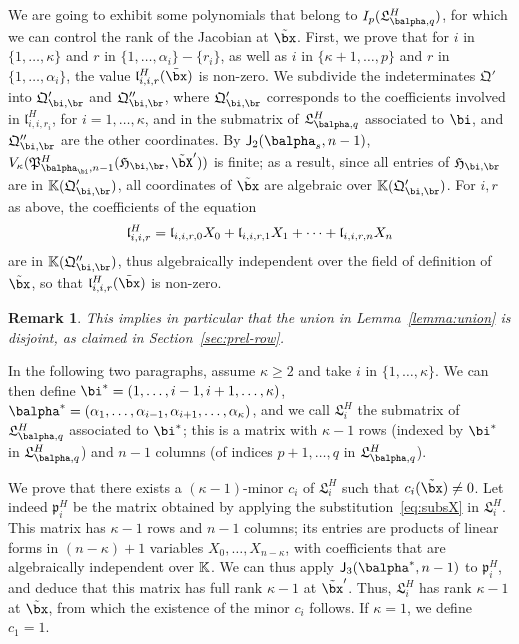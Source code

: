\documentclass[12pt]{article}
\newtheorem{remark}[definition]{Remark}
\begin{document}
We are going to exhibit some polynomials that belong to
$I_p(\mathfrak{L}^H_{\balpha,q})$, for which we can control the rank
of the Jacobian at $\tilde\bx$. First, we prove that for $i$ in
$\{1,\dots,\kappa\}$ and $r$ in $\{1,\dots,\alpha_i\}-\{r_i\}$, as
well as $i$ in $\{\kappa+1,\dots,p\}$ and $r$ in
$\{1,\dots,\alpha_i\}$, the value $\mathfrak{l}^H_{i,i,r}(\tilde\bx)$
is non-zero.  We subdivide the indeterminates $\mathfrak{Q}'$ into
$\mathfrak{Q}'_{\bi,\br}$ and $\mathfrak{Q}''_{\bi,\br}$, where
$\mathfrak{Q}'_{\bi,\br}$ corresponds to the coefficients involved in
$\mathfrak{l}^H_{i,i,r_i}$, for $i=1,\dots,\kappa$, and in the
submatrix of $\mathfrak{L}^H_{\balpha,q}$ associated to $\bi$, and
$\mathfrak{Q}''_{\bi,\br}$ are the other coordinates.  By
$\assI_2(\balpha_s,n-1)$,
$V_\kappa(\mathfrak{P}^H_{\balpha_\bi,n-1}(\mathfrak{H}_{\bi,\br},\tilde\bX'))$
is finite; as a result, since all entries of $\mathfrak{H}_{\bi,\br}$ 
are in $\KK(\mathfrak{Q}'_{\bi,\br})$,
all coordinates of $\tilde\bx$ are algebraic
over $\KK(\mathfrak{Q}'_{\bi,\br})$. For $i,r$ as above, the
coefficients of the equation
$$\mathfrak{l}^H_{i,i,r} = \frak{l}_{i,i,r,0} X_0+ \frak{l}_{i,i,r,1}
X_1 +\cdots + \frak{l}_{i,i,r,n} X_n$$ are
in  $\KK(\mathfrak{Q}''_{\bi,\br})$, thus algebraically independent
over the field of definition of $\tilde\bx$, so that $\mathfrak{l}^H_{i,i,r}(\tilde\bx)$
is non-zero.

\begin{remark}\label{remark:disjoint}
  This implies in particular that the union in Lemma~\ref{lemma:union} is disjoint,
as claimed in Section~\ref{sec:prel-row}.
\end{remark}

In the following two paragraphs, assume $\kappa \ge 2$
and take $i$ in $\{1,\dots,\kappa\}$. We can then define
$\bi^*=(1,\dots,i-1,i+1,\dots,\kappa)$,
$\balpha^*=(\alpha_1,\dots,\alpha_{i-1},\alpha_{i+1},\dots,\alpha_\kappa)$,
and we call $\mathfrak{L}^H_i$ the submatrix of
$\mathfrak{L}^H_{\balpha,q}$ associated to $\bi^*$; this is a matrix
with $\kappa-1$ rows (indexed by $\bi^*$ in
$\mathfrak{L}^H_{\balpha,q}$) and $n-1$ columns (of indices $p+1,\dots,q$ 
in $\mathfrak{L}^H_{\balpha,q}$).

We prove that there exists a $(\kappa-1)$-minor $c_i$ of
$\mathfrak{L}^H_i$ such that $c_i(\tilde\bx)\ne 0$.  Let indeed
$\mathfrak{p}^H_i$ be the matrix obtained by applying the
substitution~\eqref{eq:subsX} in $\mathfrak{L}^H_i$. This matrix 
has $\kappa-1$ rows and $n-1$ columns; its entries are products of
linear forms in $(n-\kappa)+1$ variables $X_0,\dots,X_{n-\kappa}$,
with coefficients that are algebraically
independent over $\mathbb{K}$. We can thus apply $\assI_3(\balpha^*,n-1)$ to
$\mathfrak{p}_{i}^H$, and deduce that this matrix has full rank $\kappa-1$
at $\tilde\bx'$.  Thus, $\mathfrak{L}^H_i$ has rank $\kappa-1$ at
$\tilde\bx$, from which the existence of the minor $c_i$ follows.
If $\kappa=1$, we define $c_1=1$.
\end{document}
